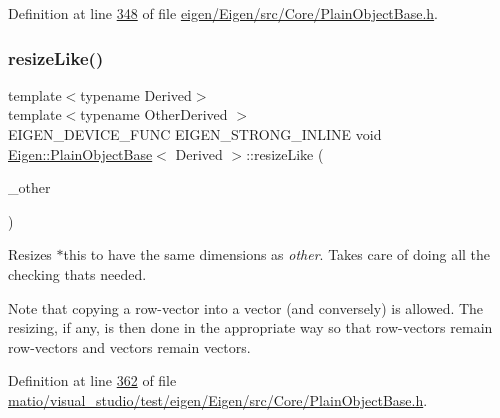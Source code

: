 Definition at line \hyperlink{eigen_2_eigen_2src_2_core_2_plain_object_base_8h_source_l00348}{348} of file \hyperlink{eigen_2_eigen_2src_2_core_2_plain_object_base_8h_source}{eigen/\+Eigen/src/\+Core/\+Plain\+Object\+Base.\+h}.

\mbox{\label{class_eigen_1_1_plain_object_base_acc7200947e6399bee847ff37c8270fc8}} 
\subsubsection{\texorpdfstring{resize\+Like()}{resizeLike()}\hspace{0.1cm}{\footnotesize\ttfamily [1/2]}}
{\footnotesize\ttfamily template$<$typename Derived$>$ \\
template$<$typename Other\+Derived $>$ \\
E\+I\+G\+E\+N\+\_\+\+D\+E\+V\+I\+C\+E\+\_\+\+F\+U\+NC E\+I\+G\+E\+N\+\_\+\+S\+T\+R\+O\+N\+G\+\_\+\+I\+N\+L\+I\+NE void \hyperlink{class_eigen_1_1_plain_object_base}{Eigen\+::\+Plain\+Object\+Base}$<$ Derived $>$\+::resize\+Like (\begin{DoxyParamCaption}\item[{const \hyperlink{group___core___module_struct_eigen_1_1_eigen_base}{Eigen\+Base}$<$ Other\+Derived $>$ \&}]{\+\_\+other }\end{DoxyParamCaption})\hspace{0.3cm}{\ttfamily [inline]}}

Resizes {\ttfamily $\ast$this} to have the same dimensions as {\itshape other}. Takes care of doing all the checking that\textquotesingle{}s needed.

Note that copying a row-\/vector into a vector (and conversely) is allowed. The resizing, if any, is then done in the appropriate way so that row-\/vectors remain row-\/vectors and vectors remain vectors. 

Definition at line \hyperlink{matio_2visual__studio_2test_2eigen_2_eigen_2src_2_core_2_plain_object_base_8h_source_l00362}{362} of file \hyperlink{matio_2visual__studio_2test_2eigen_2_eigen_2src_2_core_2_plain_object_base_8h_source}{matio/visual\+\_\+studio/test/eigen/\+Eigen/src/\+Core/\+Plain\+Object\+Base.\+h}.

\mbox{\label{class_eigen_1_1_plain_object_base_acc7200947e6399bee847ff37c8270fc8}} 
